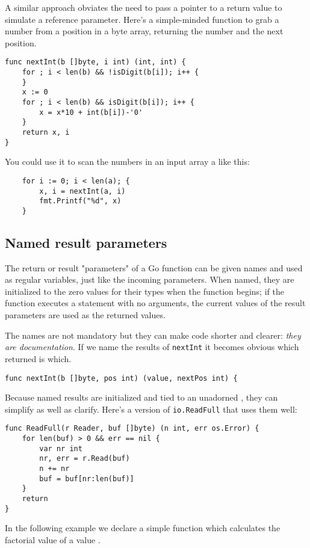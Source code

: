 A similar approach obviates the need to pass a pointer to a return value to
simulate a reference parameter. Here's a simple-minded function to grab a
number from a position in a byte array, returning the number and the next
position.
\begin{lstlisting}
func nextInt(b []byte, i int) (int, int) {
    for ; i < len(b) && !isDigit(b[i]); i++ {
    }
    x := 0
    for ; i < len(b) && isDigit(b[i]); i++ {
        x = x*10 + int(b[i])-'0'
    }
    return x, i
}
\end{lstlisting}
You could use it to scan the numbers in an input array a like this:
\begin{lstlisting}
    for i := 0; i < len(a); {
        x, i = nextInt(a, i)
        fmt.Printf("%d", x)
    }
\end{lstlisting}
\subsection{Named result parameters}
The return or result "parameters" of a Go function can be given names and used
as regular variables, just like the incoming parameters. When named, they are
initialized to the zero values for their types when the function begins; if the
function executes a  statement with no arguments, the current values of
the result parameters are used as the returned values.

The names are not mandatory but they can make code shorter and clearer:
\emph{they are documentation}. 
If we name the results of \lstinline{nextInt} it becomes obvious which
returned  is which.

\begin{lstlisting}
func nextInt(b []byte, pos int) (value, nextPos int) {
\end{lstlisting}
Because named results are initialized and tied to an unadorned
,
they can simplify as well as clarify. Here's a version of
\lstinline{io.ReadFull} that uses them well:

\begin{lstlisting}
func ReadFull(r Reader, buf []byte) (n int, err os.Error) {
    for len(buf) > 0 && err == nil {
        var nr int
        nr, err = r.Read(buf)
        n += nr
        buf = buf[nr:len(buf)]
    }
    return
}
\end{lstlisting}

In the following example we declare a simple function which calculates
the factorial value of a value .

